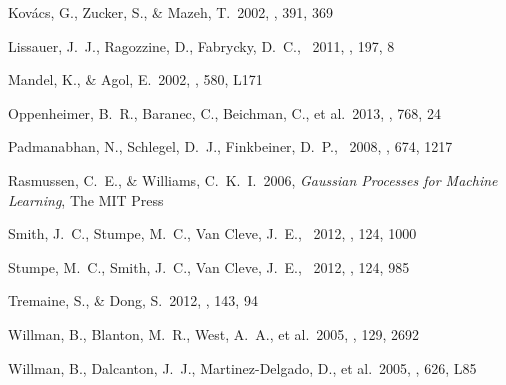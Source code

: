 \documentclass[letterpaper,12pt,preprint]{hack_aastex}
\begin{document}
\begin{thebibliography}{}
Kov{\'a}cs, G., Zucker, S., \& Mazeh, T.\ 2002, \aap, 391, 369

Lissauer, J.~J., Ragozzine, D., Fabrycky, D.~C., \etal\ 2011, \apjs, 197, 8

Mandel, K., \& Agol, E.\ 2002, \apjl, 580, L171

Oppenheimer, B.~R., Baranec, C., Beichman, C., et al.\ 2013, \apj, 768, 24

Padmanabhan, N., Schlegel, D.~J., Finkbeiner, D.~P., \etal\ 2008, \apj, 674, 1217

Rasmussen, C.~E., \& Williams, C.~K.~I.\ 2006, \emph{Gaussian Processes for
Machine Learning}, The MIT Press

Smith, J.~C., Stumpe, M.~C., Van Cleve, J.~E., \etal\ 2012, \pasp, 124, 1000

Stumpe, M.~C., Smith, J.~C., Van Cleve, J.~E., \etal\ 2012, \pasp, 124, 985

Tremaine, S., \& Dong, S.\ 2012, \aj, 143, 94

Willman, B., Blanton, M.~R., West, A.~A., et al.\ 2005, \aj, 129, 2692

Willman, B., Dalcanton, J.~J., Martinez-Delgado, D., et al.\ 2005, \apjl, 626, L85
\end{thebibliography}
\end{document}
